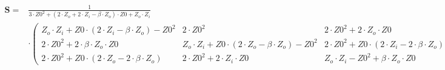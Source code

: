 $\begin{alignedat}{1}\mathbf{S}= & \frac{1}{3\cdot Z0^2+ (2\cdot
Z_o+2\cdot Z_i-\beta\cdot Z_o )\cdot Z0+Z_o\cdot Z_i}\\ & \cdot
\left(\begin{smallmatrix} Z_o\cdot Z_i+Z0\cdot  (2\cdot Z_i-\beta\cdot
Z_o )-Z0^2 & 2\cdot Z0^2 & 2\cdot Z0^2+2\cdot Z_o\cdot Z0 \\ 2\cdot
Z0^2+2\cdot \beta\cdot Z_o\cdot Z0 & Z_o\cdot Z_i+Z0\cdot  (2\cdot
Z_o-\beta\cdot Z_o )-Z0^2 & 2\cdot Z0^2+Z0\cdot  (2\cdot Z_i-2\cdot
\beta\cdot Z_o ) \\ 2\cdot Z0^2+Z0\cdot  (2\cdot Z_o-2\cdot \beta\cdot
Z_o ) & 2\cdot Z0^2+2\cdot Z_i\cdot Z0 & Z_o\cdot Z_i-Z0^2+\beta\cdot
Z_o\cdot Z0 \end{smallmatrix}\right)\end{alignedat}$
